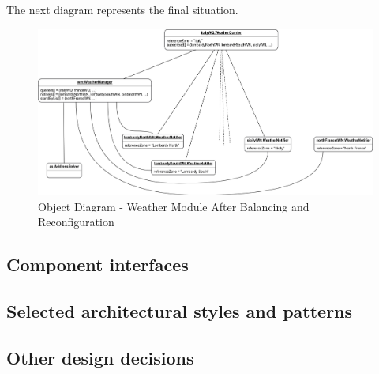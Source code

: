 		The next diagram represents the final situation.
		\begin{figure}[H]
			\centerline{\includegraphics[width=0.9\paperwidth]{Images/OD_WeatherModule_After}}
			\caption{Object Diagram - Weather Module After Balancing and Reconfiguration}
		\end{figure}
\subsection{Component interfaces}
	
\subsection{Selected architectural styles and patterns}
	
\subsection{Other design decisions}
